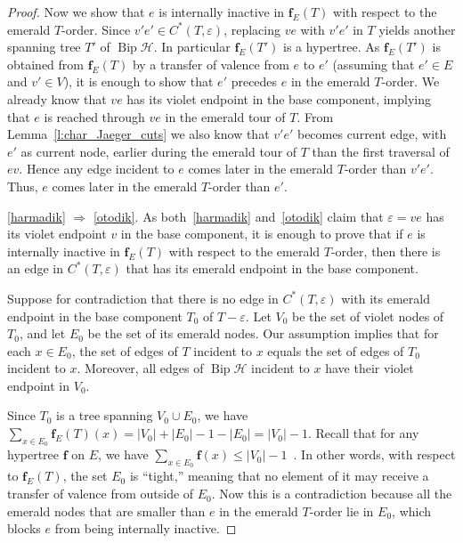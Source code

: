 \documentclass[ALCO,ThmDefs,Unicode,epreuves]{cedram}
\newcommand{\HH}{\mathcal H}
\DeclareMathOperator{\bip}{Bip}
\begin{document}
\begin{proof}
Now we show that $e$ is internally inactive in $\mathbf f_E(T)$ with respect to the emerald $T$-order. Since $v'e'\in C^*(T,\varepsilon)$, replacing $ve$ with $v'e'$ in $T$ yields another spanning tree $T'$ of $\bip \HH$. In particular $\mathbf f_E(T')$ is a hypertree. As $\mathbf f_E(T')$ is obtained from $\mathbf f_E(T)$ by a transfer of valence from $e$ to $e'$ (assuming that $e'\in E$ and $v'\in V$), it is enough to show that $e'$ precedes $e$ in the emerald $T$-order. We already know that $ve$ has its violet endpoint in the base component, implying that $e$ is reached through $ve$ in the emerald tour of $T$. From Lemma~\ref{l:char_Jaeger_cuts} we also know that $v'e'$ becomes current edge, with $e'$ as current node, earlier during the emerald tour of $T$ than the first traversal of $ev$. Hence any edge incident to $e$ comes later in the emerald $T$-order than $v'e'$. Thus, $e$ comes later in the emerald $T$-order than $e'$. 


\ref{harmadik} $\Rightarrow$ \ref{otodik}. As both~\ref{harmadik} and~\ref{otodik} claim that $\varepsilon=ve$ has its violet endpoint $v$ in the base component, it is enough to prove that if $e$ is internally inactive in $\mathbf f_E(T)$ with respect to the emerald $T$-order, then there is an edge in $C^*(T,\varepsilon)$ that has its emerald endpoint in the base component.
 
Suppose for contradiction that there is no edge in $C^*(T,\varepsilon)$ with its emerald endpoint in the base component $T_0$ of $T-\varepsilon$. Let $V_0$ be the set of violet nodes of $T_0$, and let $E_0$ be the set of its emerald nodes. Our assumption implies that for each $x\in E_0$, the set of edges of $T$ incident to $x$ equals the set of edges of $T_0$ incident to $x$. Moreover, all edges of $\bip\HH$ incident to $x$ have their violet endpoint in $V_0$.

Since $T_0$ is a tree spanning $V_0\cup E_0$, we have $\sum_{x\in E_0}\mathbf f_E(T)(x)=|V_0|+|E_0|-1-|E_0|=|V_0|-1$. Recall that for any hypertree $\mathbf f$ on $E$, we have $\sum_{x\in E_0}\mathbf f(x)\leq |V_0|-1$~\cite[Theorem~3.4]{hiperTutte}. In other words, with respect to $\mathbf f_E(T)$, the set $E_0$ is ``tight,'' meaning that no element of it may receive a transfer of valence from outside of $E_0$. Now this is a contradiction because all the emerald nodes that are smaller than $e$ in the emerald $T$-order lie in $E_0$, which blocks $e$ from being internally inactive. 


\end{proof}
\end{document}
